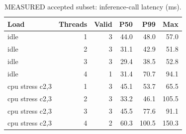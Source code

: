 \begin{table}[H]
\centering\small
\caption{MEASURED accepted subset: inference-call latency (ms).}\label{tab:infer}
\begin{tabular}{lrrrrr}
\toprule
Load & Threads & Valid & P50 & P99 & Max \\
\midrule
idle & 1 & 3 & 44.0 & 48.0 & 57.0 \\
idle & 2 & 3 & 31.1 & 42.9 & 51.8 \\
idle & 3 & 3 & 29.4 & 38.5 & 52.8 \\
idle & 4 & 1 & 31.4 & 70.7 & 94.1 \\
cpu stress c2,3 & 1 & 3 & 45.1 & 53.7 & 65.5 \\
cpu stress c2,3 & 2 & 3 & 33.2 & 46.1 & 105.5 \\
cpu stress c2,3 & 3 & 3 & 45.5 & 77.6 & 91.1 \\
cpu stress c2,3 & 4 & 2 & 60.3 & 100.5 & 150.3 \\
\bottomrule
\end{tabular}
\end{table}
